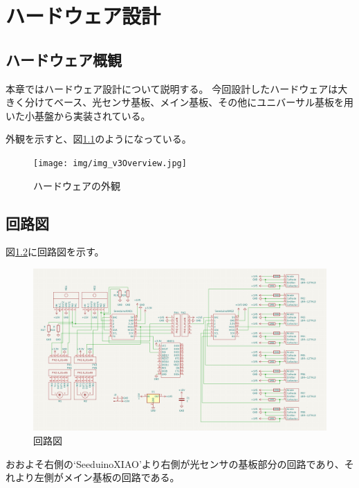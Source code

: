 \documentclass{ltjsreport}
\begin{document}



\chapter{ハードウェア設計}\label{cha:hardware}
\section{ハードウェア概観}
本章ではハードウェア設計について説明する。
今回設計したハードウェアは大きく分けてベース、光センサ基板、メイン基板、その他にユニバーサル基板を用いた小基盤から実装されている。


外観を示すと、図\ref{fig:overview}のようになっている。
\begin{figure}[tbh]
  \centering
  \texttt{[image: img/img\_v3Overview.jpg]}
  \caption{ハードウェアの外観}
  \label{fig:overview}
 \end{figure}




\section{回路図}
図\ref{fig:circuit}に回路図を示す。

\begin{figure}[tbh]
  \centering
  \includegraphics[keepaspectratio, scale=0.3]
       {img/figure_all_circuit.png}
  \caption{回路図}
  \label{fig:circuit}
 \end{figure}

おおよそ右側の`SeeduinoXIAO'より右側が光センサの基板部分の回路であり、それより左側がメイン基板の回路である。
\end{document}

